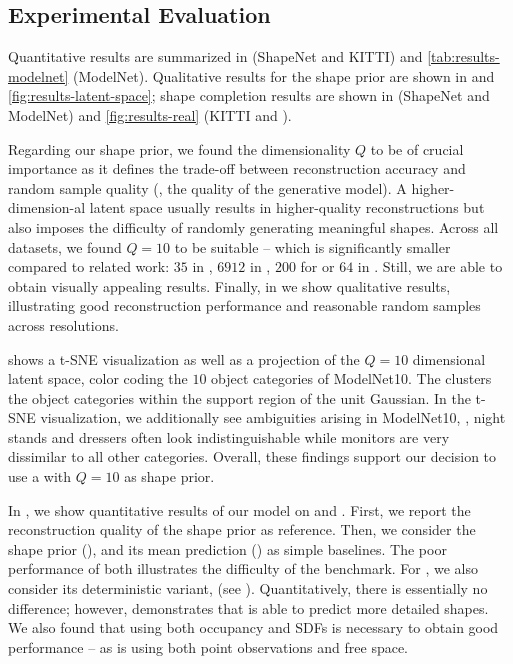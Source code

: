 \subsection{Experimental Evaluation}
\label{sec:experiments}

Quantitative results are summarized in  (ShapeNet and KITTI) and \ref{tab:results-modelnet} (ModelNet). Qualitative results for the shape prior are shown in  and \ref{fig:results-latent-space}; shape completion results are shown in  (ShapeNet and ModelNet) and \ref{fig:results-real} (KITTI and \Kinect).










%
Regarding our \DVAE shape prior, we found the dimensionality $Q$ to be of crucial importance as it defines the trade-off between reconstruction accuracy and random sample quality (\ie, the quality of the generative model). A higher-dimension-al latent space usually results in higher-quality reconstructions but also imposes the difficulty of randomly generating meaningful shapes. Across all datasets, we found $Q = 10$ to be suitable -- which is significantly smaller compared to related work: $35$ in \citep{Liu2017ARXIV}, $6912$ in \citep{Sharma2016ARXIV}, $200$ for \citep{Wu2016NIPS,Smith2017ARXIV} or $64$ in \citep{Girdhar2016ECCV}. Still, we are able to obtain visually appealing results. Finally, in  we show qualitative results, illustrating good reconstruction performance and reasonable random samples across resolutions.

 shows a t-SNE \citep{Maaten2008JMLR} visualization as well as a projection of the $Q = 10$ dimensional latent space, color coding the $10$ object categories of ModelNet10. The \DVAE clusters the object categories within the support region of the unit Gaussian. In the t-SNE visualization, we additionally see ambiguities arising in ModelNet10, \eg, night stands and dressers often look indistinguishable while monitors are very dissimilar to all other categories. Overall, these findings support our decision to use a \DVAE with $Q=10$ as shape prior.

%
In , we show quantitative results of our model on \clean and \noisy. First, we report the reconstruction quality of the \DVAE shape prior as reference. Then, we consider the \DVAE shape prior (\BL), and its mean prediction (\M) as simple baselines. The poor performance of both illustrates the difficulty of the benchmark. For \AML, we also consider its deterministic variant, \dAML (see ). Quantitatively, there is essentially no difference; however,  demonstrates that \AML is able to predict more detailed shapes. We also found that using both occupancy and SDFs is necessary to obtain good performance -- as is using both point observations and free space.

